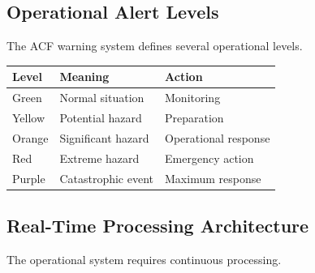 
\subsection{Operational Alert Levels}

The ACF warning system defines several operational levels.

\begin{center}

\begin{tabular}{lll}

\toprule

Level & Meaning & Action \\

\midrule

Green & Normal situation & Monitoring \\

Yellow & Potential hazard & Preparation \\

Orange & Significant hazard & Operational response \\

Red & Extreme hazard & Emergency action \\

Purple & Catastrophic event & Maximum response \\

\bottomrule

\end{tabular}

\end{center}


\subsection{Real-Time Processing Architecture}

The operational system requires continuous processing.


